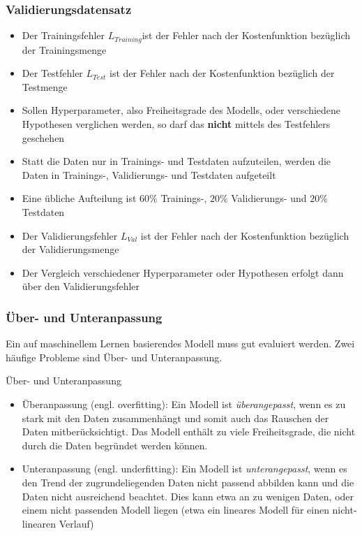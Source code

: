 \begin{frame}
\frametitle{Validierungsdatensatz}
\begin{itemize}[<+->]
\item Der Trainingsfehler $L_{Training}$ist der Fehler nach der Kostenfunktion bezüglich der Trainingsmenge
\item Der Testfehler $L_{Test}$ ist der Fehler nach der Kostenfunktion bezüglich der Testmenge
\item Sollen Hyperparameter, also Freiheitsgrade des Modells, oder verschiedene Hypothesen verglichen werden, so darf das \textbf{nicht} mittels des Testfehlers geschehen
\item Statt die Daten nur in Trainings- und Testdaten aufzuteilen, werden die Daten in Trainings-, Validierungs- und Testdaten aufgeteilt
\item Eine übliche Aufteilung ist $60\%$ Trainings-, $20\%$ Validierungs- und $20\%$ Testdaten
\item Der Validierungsfehler $L_{Val}$ ist der Fehler nach der Kostenfunktion bezüglich der Validierungsmenge
\item Der Vergleich verschiedener Hyperparameter oder Hypothesen erfolgt dann über den Validierungsfehler
\end{itemize}
\end{frame}
\begin{frame}
\frametitle{Über- und Unteranpassung}
Ein auf maschinellem Lernen basierendes Modell muss gut evaluiert werden. Zwei häufige Probleme sind Über- und Unteranpassung.
\begin{block}{Über- und Unteranpassung}
\begin{itemize}[<+->]
\item Überanpassung (engl. overfitting): Ein Modell ist \textit{überangepasst}, wenn es zu stark mit den Daten zusammenhängt und somit auch das Rauschen der Daten mitberücksichtigt. Das Modell enthält zu viele Freiheitsgrade, die nicht durch die Daten begründet werden können.

\item Unteranpassung (engl. underfitting): Ein Modell ist \textit{unterangepasst}, wenn es den Trend der zugrundeliegenden Daten nicht passend abbilden kann und die Daten nicht ausreichend beachtet. Dies kann etwa an zu wenigen Daten, oder einem nicht passenden Modell liegen (etwa ein lineares Modell für einen nicht-linearen Verlauf)
\end{itemize}
\end{block}
\end{frame}
